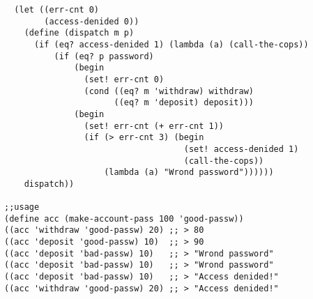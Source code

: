 \documentclass[10pt,a4paper]{article}
\begin{document}
\begin{lstlisting}
  (let ((err-cnt 0)
        (access-denided 0))
    (define (dispatch m p)
      (if (eq? access-denided 1) (lambda (a) (call-the-cops))
          (if (eq? p password)
              (begin
                (set! err-cnt 0)
                (cond ((eq? m 'withdraw) withdraw)
                      ((eq? m 'deposit) deposit)))
              (begin
                (set! err-cnt (+ err-cnt 1))
                (if (> err-cnt 3) (begin
                                    (set! access-denided 1)
                                    (call-the-cops))
                    (lambda (a) "Wrond password"))))))
    dispatch))

;;usage
(define acc (make-account-pass 100 'good-passw))
((acc 'withdraw 'good-passw) 20) ;; > 80
((acc 'deposit 'good-passw) 10)  ;; > 90
((acc 'deposit 'bad-passw) 10)   ;; > "Wrond password"
((acc 'deposit 'bad-passw) 10)   ;; > "Wrond password"
((acc 'deposit 'bad-passw) 10)   ;; > "Access denided!"
((acc 'withdraw 'good-passw) 20) ;; > "Access denided!"

\end{lstlisting}
\end{document}
